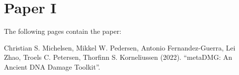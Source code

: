 \chapter{Paper I}
\label{chapter:metadmg}

The following pages contain the paper:
\vspace*{1cm}


Christian S. Michelsen, Mikkel W. Pedersen, Antonio Fernandez-Guerra, Lei Zhao, Troels C. Petersen, Thorfinn S. Korneliussen (2022). ``metaDMG: An Ancient DNA Damage Toolkit''.

% 


